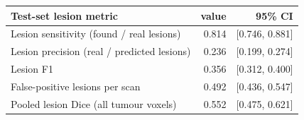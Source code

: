 \begin{tabular}{lrr}
\toprule
Test-set lesion metric & value & 95\% CI \\
\midrule
Lesion sensitivity (found / real lesions) & 0.814 & [0.746, 0.881] \\
Lesion precision (real / predicted lesions) & 0.236 & [0.199, 0.274] \\
Lesion F1 & 0.356 & [0.312, 0.400] \\
False-positive lesions per scan & 0.492 & [0.436, 0.547] \\
Pooled lesion Dice (all tumour voxels) & 0.552 & [0.475, 0.621] \\
\bottomrule
\end{tabular}
